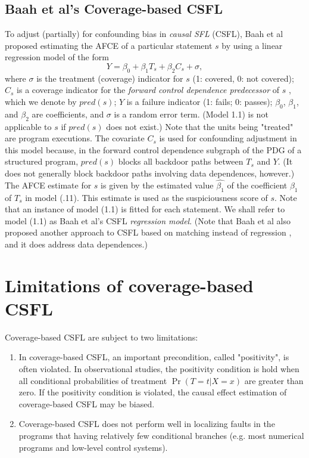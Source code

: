 \subsection {Baah et al's Coverage-based CSFL}
To adjust (partially) for confounding bias in {\it causal SFL} (CSFL), Baah et al proposed estimating the AFCE of a particular statement $s$ by using a linear regression model of the form
\begin{equation}\label{eq1}
Y=\beta_0+\beta_1T_s+\beta_2C_s+\sigma,
\end{equation}
where $\sigma$ is the treatment (coverage) indicator for $s$ (1: covered, 0: not covered); $C_s$ is a coverage indicator for the {\it forward control dependence predecessor} of $s$ \cite{ball1993s}, which we denote by $pred(s)$; $Y$ is a failure indicator (1: fails; 0: passes); $\beta_0$, $\beta_1$, and $\beta_2$ are coefficients, and $\sigma$ is a random error term.  (Model 1.1) is not applicable to $s$ if $pred(s)$ does not exist.)  Note that the units being "treated" are program executions.  The covariate $C_s$ is used for confounding adjustment in this model because, in the forward control dependence subgraph of the PDG of a structured program, $pred(s)$ blocks all backdoor paths between $T_s$ and $Y$.  (It does not generally block backdoor paths involving data dependences, however.)  The AFCE estimate for $s$ is given by the estimated value $\widehat{\beta_1}$ of the coefficient $\beta_1$ of $T_s$ in model (.11).  This estimate is used as the suspiciousness score of $s$.  Note that an instance of model (1.1) is fitted for each statement.  We shall refer to model (1.1) as Baah et al’s CSFL {\it regression model}.  (Note that Baah et al also proposed another approach to CSFL based on matching instead of regression \cite{baah2011mitigating}, and it does address data dependences.)

\section{Limitations of coverage-based CSFL}
Coverage-based CSFL are subject to two limitations:
\begin{enumerate}
\item In coverage-based CSFL, an important precondition, called "positivity", is often violated. In observational studies, the positivity condition is hold when all conditional probabilities of treatment $\Pr (T = t|X = x) $ are greater than zero. If the positivity condition is violated, the causal effect estimation of coverage-based CSFL may be biased.
\item Coverage-based CSFL does not perform well in localizing faults in the programs that having relatively few conditional branches (e.g. most numerical programs and low-level control systems).
\end{enumerate}  

